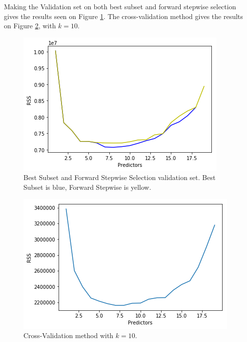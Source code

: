 Making the Validation set on both best subset and forward stepwise selection gives the results seen on Figure \ref{fig:validatedBestSubsetAndForwardStepwise}. The cross-validation method gives the results on Figure \ref{fig:crossValidationRSS}, with $k=10$.

\begin{figure}[h]
	\centering
	\includegraphics[scale=0.4]{subsetSelection/modelQualification/fig/validatedBestSubsetAndForwardStepwise.png}
	\caption{Best Subset and Forward Stepwise Selection validation set. Best Subset is blue, Forward Stepwise is yellow.}
	\label{fig:validatedBestSubsetAndForwardStepwise}
\end{figure}

\begin{figure}[h]
	\centering
	\includegraphics[scale=0.4]{subsetSelection/modelQualification/fig/crossValidation.png}
	\caption{Cross-Validation method with $k=10$.}
	\label{fig:crossValidationRSS}
\end{figure}